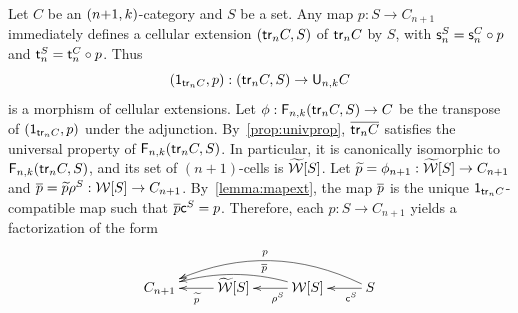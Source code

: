 \begin{paragr}\label{paragr:addproperties}
  Let $C$ be an $(n{+}1,k)$-category and $S$ be a set. Any map
  $p:S\to C_{n+1}$ immediately defines a cellular extension $(\mathsf{tr}_{n} C,S)$ of
  $\mathsf{tr}_{n} C$ by $S$, with $\mathsf{s}_{n}^S=\mathsf{s}_{n}^C\circ p$ and $\mathsf{t}_{n}^S=\mathsf{t}_{n}^C\circ p$. Thus
\[(\mathsf{1}_{\mathsf{tr}_{n} C},p):(\mathsf{tr}_{n} C,S)\to\mathsf{U}_{n,k}C\]
is a morphism of cellular extensions.
Let $\phi:\mathsf{F}_{n,k}(\mathsf{tr}_{n} C,S)\to C$ be the transpose of $(\mathsf{1}_{\mathsf{tr}_{n} C},p)$ under the adjunction.
By~\cref{prop:univprop}, $\overline{\mathsf{tr}_{n} C}$ satisfies the universal property
of
$\mathsf{F}_{n,k}(\mathsf{tr}_{n} C,S)$. In particular, it is canonically isomorphic to
$\mathsf{F}_{n,k}(\mathsf{tr}_{n} C,S)$, and its set of $(n{+}1)$-cells is $\widetilde{\mathcal{W}}[S]$.
 Let $\widetilde{p}=\phi_{n+1}:\widetilde{\mathcal{W}}[S]\to C_{n+1}$ and $\overline{p}=\widetilde{p}\rho^{S}:\mathcal{W}[S]\to C_{n+1}$. By~\cref{lemma:mapext}, the map $\overline{p}$ is the
unique $\mathsf{1}_{\mathsf{tr}_{n}C}$-compatible map such that $\overline{p}\mathsf{c}^{S}=p$. Therefore, each $p:S\to C_{n+1}$ yields a factorization of the
form
\begin{equation}
  \label{eq:factor}
  \xymatrix{C_{n+1} & \wtxeq S \ar[l]^{\fcls{p}}& \wtx S\ar[l]^(.4){\cans{S}} \ar@/_1em/[ll]_(.3){\extend{p}}& S\ar[l]^(.3){\finc{S}}\ar@/_2em/[lll]_p}
\end{equation}
\end{paragr}


